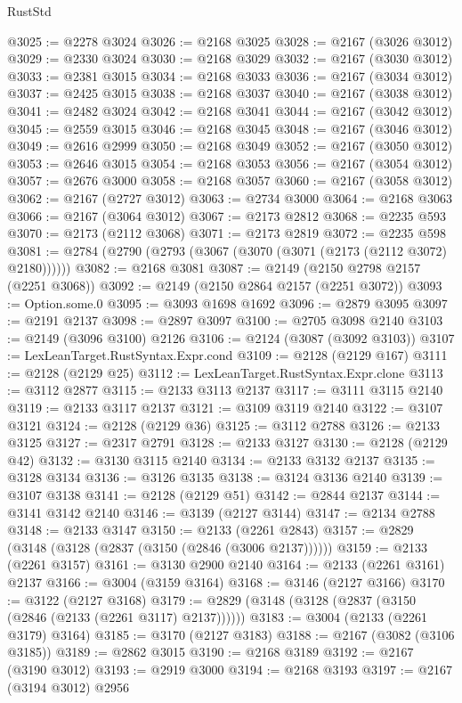 \begin{lexlean}{RustStd}
\begin{coremodule}
@3025 := @2278 @3024
@3026 := @2168 @3025
@3028 := @2167 (@3026 @3012)
@3029 := @2330 @3024
@3030 := @2168 @3029
@3032 := @2167 (@3030 @3012)
@3033 := @2381 @3015
@3034 := @2168 @3033
@3036 := @2167 (@3034 @3012)
@3037 := @2425 @3015
@3038 := @2168 @3037
@3040 := @2167 (@3038 @3012)
@3041 := @2482 @3024
@3042 := @2168 @3041
@3044 := @2167 (@3042 @3012)
@3045 := @2559 @3015
@3046 := @2168 @3045
@3048 := @2167 (@3046 @3012)
@3049 := @2616 @2999
@3050 := @2168 @3049
@3052 := @2167 (@3050 @3012)
@3053 := @2646 @3015
@3054 := @2168 @3053
@3056 := @2167 (@3054 @3012)
@3057 := @2676 @3000
@3058 := @2168 @3057
@3060 := @2167 (@3058 @3012)
@3062 := @2167 (@2727 @3012)
@3063 := @2734 @3000
@3064 := @2168 @3063
@3066 := @2167 (@3064 @3012)
@3067 := @2173 @2812
@3068 := @2235 @593
@3070 := @2173 (@2112 @3068)
@3071 := @2173 @2819
@3072 := @2235 @598
@3081 := @2784 (@2790 (@2793 (@3067 (@3070 (@3071 (@2173 (@2112 @3072) @2180))))))
@3082 := @2168 @3081
@3087 := @2149 (@2150 @2798 @2157 (@2251 @3068))
@3092 := @2149 (@2150 @2864 @2157 (@2251 @3072))
@3093 := Option.some.{0}
@3095 := @3093 @1698 @1692
@3096 := @2879 @3095
@3097 := @2191 @2137
@3098 := @2897 @3097
@3100 := @2705 @3098 @2140
@3103 := @2149 (@3096 @3100) @2126
@3106 := @2124 (@3087 (@3092 @3103))
@3107 := LexLeanTarget.RustSyntax.Expr.cond
@3109 := @2128 (@2129 @167)
@3111 := @2128 (@2129 @25)
@3112 := LexLeanTarget.RustSyntax.Expr.clone
@3113 := @3112 @2877
@3115 := @2133 @3113 @2137
@3117 := @3111 @3115 @2140
@3119 := @2133 @3117 @2137
@3121 := @3109 @3119 @2140
@3122 := @3107 @3121
@3124 := @2128 (@2129 @36)
@3125 := @3112 @2788
@3126 := @2133 @3125
@3127 := @2317 @2791
@3128 := @2133 @3127
@3130 := @2128 (@2129 @42)
@3132 := @3130 @3115 @2140
@3134 := @2133 @3132 @2137
@3135 := @3128 @3134
@3136 := @3126 @3135
@3138 := @3124 @3136 @2140
@3139 := @3107 @3138
@3141 := @2128 (@2129 @51)
@3142 := @2844 @2137
@3144 := @3141 @3142 @2140
@3146 := @3139 (@2127 @3144)
@3147 := @2134 @2788
@3148 := @2133 @3147
@3150 := @2133 (@2261 @2843)
@3157 := @2829 (@3148 (@3128 (@2837 (@3150 (@2846 (@3006 @2137))))))
@3159 := @2133 (@2261 @3157)
@3161 := @3130 @2900 @2140
@3164 := @2133 (@2261 @3161) @2137
@3166 := @3004 (@3159 @3164)
@3168 := @3146 (@2127 @3166)
@3170 := @3122 (@2127 @3168)
@3179 := @2829 (@3148 (@3128 (@2837 (@3150 (@2846 (@2133 (@2261 @3117) @2137))))))
@3183 := @3004 (@2133 (@2261 @3179) @3164)
@3185 := @3170 (@2127 @3183)
@3188 := @2167 (@3082 (@3106 @3185))
@3189 := @2862 @3015
@3190 := @2168 @3189
@3192 := @2167 (@3190 @3012)
@3193 := @2919 @3000
@3194 := @2168 @3193
@3197 := @2167 (@3194 @3012) @2956

\end{coremodule}
\end{lexlean}
